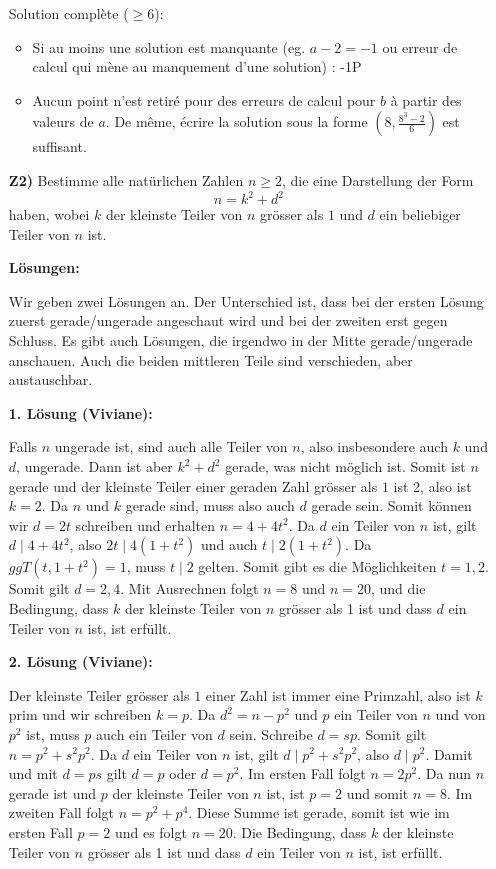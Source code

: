\documentclass[language=german,style=solution]{smo}
\begin{document}
\begin{enumerate}
Solution complète ($\geq 6$):
\begin{itemize}
\item Si au moins une solution est manquante (eg. $a-2=-1$ ou erreur de calcul qui mène au manquement d'une solution) : -1P
\item Aucun point n'est retiré pour des erreurs de calcul pour $b$ à partir des valeurs de $a$. De même, écrire la solution sous la forme $(8,\frac{8^3-2}{6})$ est suffisant.
\end{itemize}

\newpage

\item[\textbf{Z2)}] 
Bestimme alle natürlichen Zahlen $n \geq 2$, die eine Darstellung der Form
\[
n =  k^2 + d^2
\]
haben, wobei $k$ der kleinste Teiler von $n$ grösser als $1$ und $d$ ein beliebiger Teiler von $n$ ist.

\textbf{Lösungen:}

Wir geben zwei Lösungen an. Der Unterschied ist, dass bei der ersten Lösung zuerst gerade/ungerade angeschaut wird und bei der zweiten erst gegen Schluss. Es gibt auch Lösungen, die irgendwo in der Mitte gerade/ungerade anschauen. Auch die beiden mittleren Teile sind verschieden, aber austauschbar.

\textbf{1. Lösung (Viviane):}

Falls $n$ ungerade ist, sind auch alle Teiler von $n$, also insbesondere auch $k$ und $d$, ungerade. Dann ist aber $k^2+d^2$ gerade, was nicht möglich ist. Somit ist $n$ gerade und der kleinste Teiler einer geraden Zahl grösser als $1$ ist 2, also ist $k=2$. Da $n$ und $k$ gerade sind, muss also auch $d$ gerade sein. Somit können wir $d=2t$ schreiben und erhalten $n=4+4t^2$. Da $d$ ein Teiler von $n$ ist, gilt $d\mid 4+4t^2$, also $2t\mid 4(1+t^2)$ und auch $t\mid 2(1+t^2)$. Da $ggT(t, 1+t^2)=1$, muss $t\mid 2$ gelten. Somit gibt es die Möglichkeiten $t=1,2$. Somit gilt $d=2,4$. Mit Ausrechnen folgt $n=8$ und $n=20$, und die Bedingung, dass $k$ der kleinste Teiler von $n$ grösser als 1 ist und dass $d$ ein Teiler von $n$ ist, ist erfüllt.

\textbf{2. Lösung (Viviane):}

Der kleinste Teiler grösser als $1$ einer Zahl ist immer eine Primzahl, also ist $k$ prim und wir schreiben $k=p$. Da $d^2=n-p^2$ und $p$ ein Teiler von $n$ und von $p^2$ ist, muss $p$ auch ein Teiler von $d$ sein. Schreibe $d=sp$. Somit gilt $n=p^2+s^2p^2$. Da $d$ ein Teiler von $n$ ist, gilt $d\mid p^2+s^2p^2$, also $d\mid p^2$. Damit und mit $d=ps$ gilt $d=p$ oder $d=p^2$. Im ersten Fall folgt $n=2p^2$. Da nun $n$ gerade ist und $p$ der kleinste Teiler von $n$ ist, ist $p=2$ und somit $n=8$. Im zweiten Fall folgt $n=p^2+p^4$. Diese Summe ist gerade, somit ist wie im ersten Fall $p=2$ und es folgt $n=20$. Die Bedingung, dass $k$ der kleinste Teiler von $n$ grösser als 1 ist und dass $d$ ein Teiler von $n$ ist, ist erfüllt.


\end{enumerate}
\end{document}

